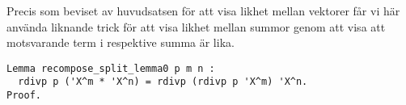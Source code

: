 Precis som beviset av huvudsatsen för att visa likhet mellan vektorer får vi
här använda liknande trick för att visa likhet mellan summor genom att visa att
motsvarande term i respektive summa är lika.
\begin{lstlisting}
Lemma recompose_split_lemma0 p m n :
  rdivp p ('X^m * 'X^n) = rdivp (rdivp p 'X^m) 'X^n.
Proof.
\end{lstlisting}
